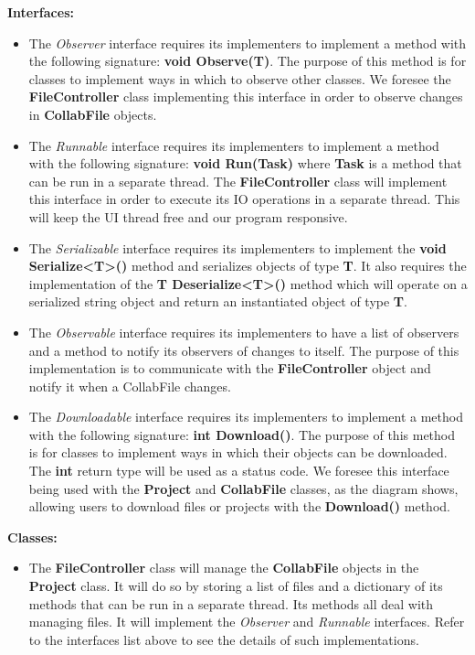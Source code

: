 \documentclass[twoside,letterpaper]{article}
\begin{document}
{\textbf{Interfaces:}\\
\begin{itemize}
	\item The \textit{Observer} interface requires its implementers to implement a method with the following signature: \textbf{void Observe(T)}. The purpose of this method is for classes to implement ways in which to observe other classes. We foresee the \textbf{FileController} class implementing this interface in order to observe changes in \textbf{CollabFile} objects.
	\item The \textit{Runnable} interface requires its implementers to implement a method with the following signature: \textbf{void Run(Task)} where \textbf{Task} is a method that can be run in a separate thread. The \textbf{FileController} class will implement this interface in order to execute its IO operations in a separate thread. This will keep the UI thread free and our program responsive.
	\item The \textit{Serializable} interface requires its implementers to implement the \textbf{void Serialize<T>()} method and serializes objects of type \textbf{T}. It also requires the implementation of the \textbf{T Deserialize<T>()} method which will operate on a serialized string object and return an instantiated object of type \textbf{T}.
	\item The \textit{Observable} interface requires its implementers to have a list of observers and a method to notify its observers of changes to itself. The purpose of this implementation is to communicate with the \textbf{FileController} object and notify it when a CollabFile changes.
	\item The \textit{Downloadable} interface requires its implementers to implement a method with the following signature: \textbf{int Download()}. The purpose of this method is for classes to implement ways in which their objects can be downloaded. The \textbf{int} return type will be used as a status code. We foresee this interface being used with the \textbf{Project} and \textbf{CollabFile} classes, as the diagram shows, allowing users to download files or projects with the \textbf{Download()} method.
\end{itemize}
\textbf{Classes:}
\begin{itemize}
	\item The \textbf{FileController} class will manage the \textbf{CollabFile} objects in the \textbf{Project} class. It will do so by storing a list of files and a dictionary of its methods that can be run in a separate thread. Its methods all deal with managing files. It will implement the \textit{Observer} and \textit{Runnable} interfaces. Refer to the interfaces list above to see the details of such implementations.

\end{itemize}}
\end{document}
